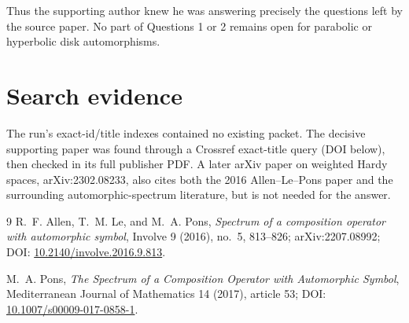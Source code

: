 \documentclass[11pt]{article}
\begin{document}
Thus the supporting author knew he was answering precisely the questions left
by the source paper.  No part of Questions 1 or 2 remains open for parabolic
or hyperbolic disk automorphisms.

\section*{Search evidence}

The run's exact-id/title indexes contained no existing packet.  The decisive
supporting paper was found through a Crossref exact-title query (DOI below),
then checked in its full publisher PDF.  A later arXiv paper on weighted Hardy
spaces, arXiv:2302.08233, also cites both the 2016 Allen--Le--Pons paper and the
surrounding automorphic-spectrum literature, but is not needed for the answer.

\begin{thebibliography}{9}
R.~F. Allen, T.~M. Le, and M.~A. Pons,
\emph{Spectrum of a composition operator with automorphic symbol},
Involve 9 (2016), no.~5, 813--826;
arXiv:2207.08992; DOI: \href{https://doi.org/10.2140/involve.2016.9.813}{10.2140/involve.2016.9.813}.

M.~A. Pons,
\emph{The Spectrum of a Composition Operator with Automorphic Symbol},
Mediterranean Journal of Mathematics 14 (2017), article 53;
DOI: \href{https://doi.org/10.1007/s00009-017-0858-1}{10.1007/s00009-017-0858-1}.
\end{thebibliography}
\end{document}
